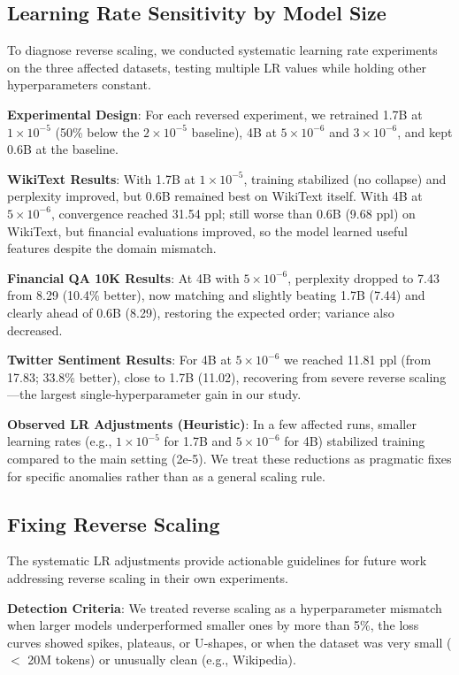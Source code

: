 \subsection{Learning Rate Sensitivity by Model Size}

To diagnose reverse scaling, we conducted systematic learning rate experiments on the three affected datasets, testing multiple LR values while holding other hyperparameters constant.

\textbf{Experimental Design}: For each reversed experiment, we retrained 1.7B at $1\times10^{-5}$ (50\% below the $2\times10^{-5}$ baseline), 4B at $5\times10^{-6}$ and $3\times10^{-6}$, and kept 0.6B at the baseline.

\textbf{WikiText Results}: With 1.7B at $1\times10^{-5}$, training stabilized (no collapse) and perplexity improved, but 0.6B remained best on WikiText itself. With 4B at $5\times10^{-6}$, convergence reached 31.54 ppl; still worse than 0.6B (9.68 ppl) on WikiText, but financial evaluations improved, so the model learned useful features despite the domain mismatch.

\textbf{Financial QA 10K Results}: At 4B with $5\times10^{-6}$, perplexity dropped to 7.43 from 8.29 (10.4\% better), now matching and slightly beating 1.7B (7.44) and clearly ahead of 0.6B (8.29), restoring the expected order; variance also decreased.

\textbf{Twitter Sentiment Results}: For 4B at $5\times10^{-6}$ we reached 11.81 ppl (from 17.83; 33.8\% better), close to 1.7B (11.02), recovering from severe reverse scaling—the largest single‑hyperparameter gain in our study.

\textbf{Observed LR Adjustments (Heuristic)}: In a few affected runs, smaller learning rates (e.g., $1\times10^{-5}$ for 1.7B and $5\times10^{-6}$ for 4B) stabilized training compared to the main setting (2e-5). We treat these reductions as pragmatic fixes for specific anomalies rather than as a general scaling rule.

\subsection{Fixing Reverse Scaling}

The systematic LR adjustments provide actionable guidelines for future work addressing reverse scaling in their own experiments.

\textbf{Detection Criteria}: We treated reverse scaling as a hyperparameter mismatch when larger models underperformed smaller ones by more than 5\%, the loss curves showed spikes, plateaus, or U‑shapes, or when the dataset was very small ($<$ 20M tokens) or unusually clean (e.g., Wikipedia).

